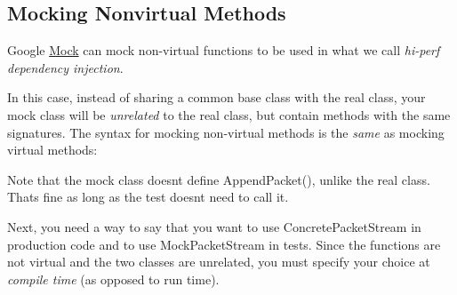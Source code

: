 \subsection*{Mocking Nonvirtual Methods}

Google \mbox{\hyperlink{class_mock}{Mock}} can mock non-\/virtual functions to be used in what we call {\itshape hi-\/perf dependency injection}.

In this case, instead of sharing a common base class with the real class, your mock class will be {\itshape unrelated} to the real class, but contain methods with the same signatures. The syntax for mocking non-\/virtual methods is the {\itshape same} as mocking virtual methods\+:


\begin{DoxyCode}{0}
\DoxyCodeLine{\textcolor{comment}{// A simple packet stream class.  None of its members is virtual.}}
\DoxyCodeLine{ \textcolor{keyword}{public}:}
\DoxyCodeLine{\};}
\DoxyCodeLine{}
\DoxyCodeLine{\textcolor{comment}{// A mock packet stream class.  It inherits from no other, but defines}}
\DoxyCodeLine{\textcolor{comment}{// GetPacket() and NumberOfPackets().}}
\DoxyCodeLine{ \textcolor{keyword}{public}:}
\DoxyCodeLine{\};}
\end{DoxyCode}


Note that the mock class doesn\textquotesingle{}t define {\ttfamily Append\+Packet()}, unlike the real class. That\textquotesingle{}s fine as long as the test doesn\textquotesingle{}t need to call it.

Next, you need a way to say that you want to use {\ttfamily Concrete\+Packet\+Stream} in production code and to use {\ttfamily Mock\+Packet\+Stream} in tests. Since the functions are not virtual and the two classes are unrelated, you must specify your choice at {\itshape compile time} (as opposed to run time).

